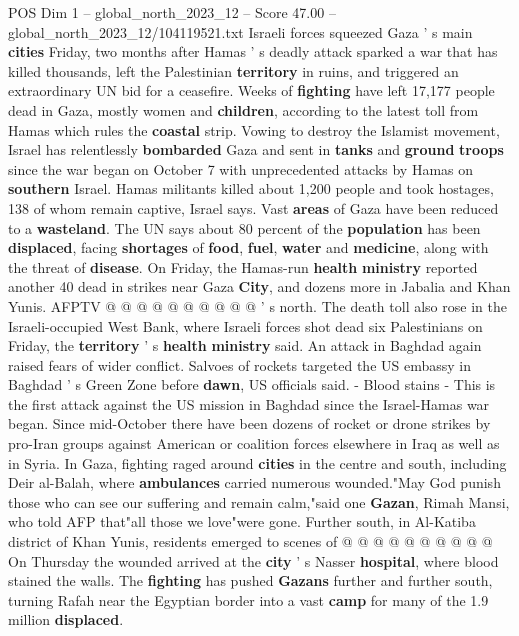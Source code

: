 \begin{textsample}{POS Dim 1 – global\_north\_2023\_12 – Score 47.00 – global\_north\_2023\_12/104119521.txt}  \label{ex:f1_pos_084}
Israeli forces squeezed Gaza ' s main \textbf{cities} Friday, two months after Hamas ' s deadly attack sparked a war that has killed thousands, left the Palestinian \textbf{territory} in ruins, and triggered an extraordinary UN bid for a ceasefire.
Weeks of \textbf{fighting} have left 17,177 people dead in Gaza, mostly women and \textbf{children}, according to the latest toll from Hamas which rules the \textbf{coastal} strip.
Vowing to destroy the Islamist movement, Israel has relentlessly \textbf{bombarded} Gaza and sent in \textbf{tanks} and \textbf{ground} \textbf{troops} since the war began on October 7 with unprecedented attacks by Hamas on \textbf{southern} Israel.
Hamas militants killed about 1,200 people and took hostages, 138 of whom remain captive, Israel says.
Vast \textbf{areas} of Gaza have been reduced to a \textbf{wasteland}.
The UN says about 80 percent of the \textbf{population} has been \textbf{displaced}, facing \textbf{shortages} of \textbf{food}, \textbf{fuel}, \textbf{water} and \textbf{medicine}, along with the threat of \textbf{disease}.
On Friday, the Hamas-run \textbf{health} \textbf{ministry} reported another 40 dead in strikes near Gaza \textbf{City}, and dozens more in Jabalia and Khan Yunis.
AFPTV @ @ @ @ @ @ @ @ @ @ ' s north.
The death toll also rose in the Israeli-occupied West Bank, where Israeli forces shot dead six Palestinians on Friday, the \textbf{territory} ' s \textbf{health} \textbf{ministry} said.
An attack in Baghdad again raised fears of wider conflict.
Salvoes of rockets targeted the US embassy in Baghdad ' s Green Zone before \textbf{dawn}, US officials said. - Blood stains - This is the first attack against the US mission in Baghdad since the Israel-Hamas war began.
Since mid-October there have been dozens of rocket or drone strikes by pro-Iran groups against American or coalition forces elsewhere in Iraq as well as in Syria.
In Gaza, fighting raged around \textbf{cities} in the centre and south, including Deir al-Balah, where \textbf{ambulances} carried numerous wounded."May God punish those who can see our suffering and remain calm,"said one \textbf{Gazan}, Rimah Mansi, who told AFP that"all those we love"were gone.
Further south, in Al-Katiba district of Khan Yunis, residents emerged to scenes of @ @ @ @ @ @ @ @ @ @ On Thursday the wounded arrived at the \textbf{city} ' s Nasser \textbf{hospital}, where blood stained the walls.
The \textbf{fighting} has pushed \textbf{Gazans} further and further south, turning Rafah near the Egyptian border into a vast \textbf{camp} for many of the 1.9 million \textbf{displaced}.

\end{textsample}

